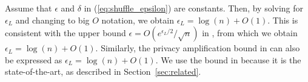 Assume that $\epsilon$ and $\delta$ in (\ref{eq:shuffle_epsilon}) are constants. 
Then, by solving for $\epsilon_L$ and changing to big $O$ notation, we obtain  $\epsilon_L = \log(n) + O(1)$. 
This is consistent with the upper bound $\epsilon = O(e^{\epsilon_L / 2} / \sqrt{n})$ in \cite{Feldman_FOCS21}, from which we obtain $\epsilon_L = \log(n) + O(1)$. 
Similarly, the privacy amplification bound in \cite{Cheu_EUROCRYPT19} can also be expressed as $\epsilon_L = \log(n) + O(1)$. 
We use the bound in \cite{Feldman_FOCS21} because it is the state-of-the-art, as described in Section~\ref{sec:related}. 


